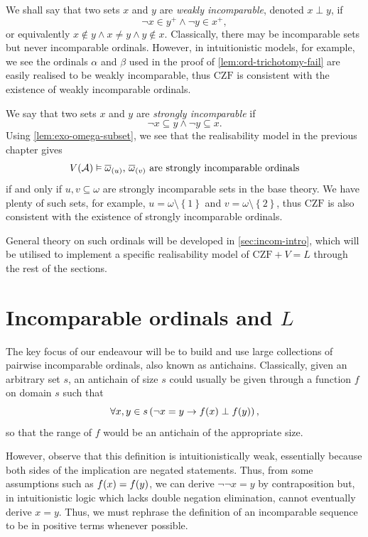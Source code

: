 \documentclass[12pt,openany]{book}
\makeatletter
\newcommand\inds[1]{\index{C@Set theory!#1}}
\theoremstyle{plain}
\theoremstyle{definition}
\newcommand\opA[1]{\mathop{\forall #1}}
\newcommand\CZF{\mathrm{CZF}}
\makeatother
\begin{document}
We shall say that two sets $x$ and $y$ are \emph{weakly incomparable}\inds{incomparable set}, denoted $x \perp y$, if
\[\neg x \in y^+ \land \neg y \in x^+,\]
or equivalently $x \not\in y \land x \neq y \land y \not\in x$. Classically, there may be incomparable sets but never incomparable ordinals. However, in intuitionistic models, for example, we see the ordinals $\alpha$ and $\beta$ used in the proof of \autoref{lem:ord-trichotomy-fail} are easily realised to be weakly incomparable, thus $\CZF$ is consistent with the existence of weakly incomparable ordinals.

We say that two sets $x$ and $y$ are \emph{strongly incomparable} if
\[\neg x \subseteq y \land \neg y \subseteq x.\]
Using \autoref{lem:exo-omega-subset}, we see that the realisability model in the previous chapter gives
\[V\mleft(\mathcal{A}\mright) \vDash \text{$\overline{\omega}_{(u)}$, $\overline{\omega}_{(v)}$ are strongly incomparable ordinals}\]
if and only if $u, v \subseteq \omega$ are strongly incomparable sets in the base theory. We have plenty of such sets, for example, $u = \omega \setminus \left\{1\right\}$ and $v = \omega \setminus \left\{2\right\}$, thus $\CZF$ is also consistent with the existence of strongly incomparable ordinals.

General theory on such ordinals will be developed in \autoref{sec:incom-intro}, which will be utilised to implement a specific realisability model of $\CZF + V = L$ through the rest of the sections.

\section{Incomparable ordinals and \texorpdfstring{$L$}{L}}
\label{sec:incom-intro}

The key focus of our endeavour will be to build and use large collections of pairwise incomparable ordinals, also known as antichains. Classically, given an arbitrary set $s$, an antichain of size $s$ could usually be given through a function $f$ on domain $s$ such that
\[\opA{x, y \in s} \left(\neg x = y \rightarrow f\mleft(x\mright) \perp f\mleft(y\mright)\right),\]
so that the range of $f$ would be an antichain of the appropriate size.

However, observe that this definition is intuitionistically weak, essentially because both sides of the implication are negated statements. Thus, from some assumptions such as $f\mleft(x\mright) = f\mleft(y\mright)$, we can derive $\neg \neg x = y$ by contraposition but, in intuitionistic logic which lacks double negation elimination, cannot eventually derive $x = y$. Thus, we must rephrase the definition of an incomparable sequence to be in positive terms whenever possible.
\end{document}
